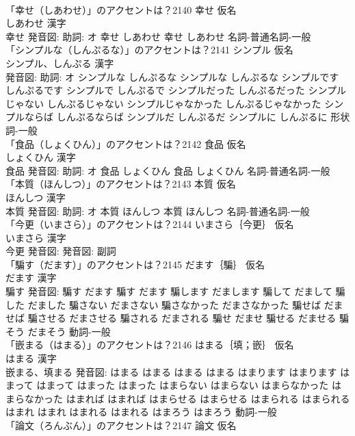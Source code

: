 \documentclass[8pt]{extreport}
\begin{document}
\begin{CJK}{UTF8}{min}
\\	「幸せ（しあわせ）」のアクセントは？2140	幸せ 仮名　
\\	しあわせ 漢字　
\\	幸せ 発音図: 助詞: オ	幸せ しあわせ		幸せ しあわせ				名詞-普通名詞-一般 
\\	「シンプルな（しんぷるな）」のアクセントは？2141	シンプル 仮名　
\\	シンプル、しんぷる 漢字　
\\	発音図: 助詞: オ	シンプルな しんぷるな		シンプルな しんぷるな シンプルです しんぷるです シンプルで しんぷるで シンプルだった しんぷるだった シンプルじゃない しんぷるじゃない シンプルじゃなかった しんぷるじゃなかった シンプルならば しんぷるならば シンプルだ しんぷるだ シンプルに しんぷるに				形状詞-一般 
\\	「食品（しょくひん）」のアクセントは？2142	食品 仮名　
\\	しょくひん 漢字　
\\	食品 発音図: 助詞: オ	食品 しょくひん		食品 しょくひん				名詞-普通名詞-一般 
\\	「本質（ほんしつ）」のアクセントは？2143	本質 仮名　
\\	ほんしつ 漢字　
\\	本質 発音図: 助詞: オ	本質 ほんしつ		本質 ほんしつ				名詞-普通名詞-一般 
\\	「今更（いまさら）」のアクセントは？2144	いまさら｛今更｝ 仮名　
\\	いまさら 漢字　
\\	今更 発音図: 発音図:							副詞 
\\	「騙す（だます）」のアクセントは？2145	だます｛騙｝ 仮名　
\\	だます 漢字　
\\	騙す 発音図:	騙す だます		騙す だます 騙します だまします 騙して だまして 騙した だました 騙さない だまさない 騙さなかった だまさなかった 騙せば だませば 騙させる だまさせる 騙される だまされる 騙せ だませ 騙せる だませる 騙そう だまそう				動詞-一般 
\\	「嵌まる（はまる）」のアクセントは？2146	はまる｛填；嵌｝ 仮名　
\\	はまる 漢字　
\\	嵌まる、填まる 発音図:	はまる はまる		はまる はまる はまります はまります はまって はまって はまった はまった はまらない はまらない はまらなかった はまらなかった はまれば はまれば はまらせる はまらせる はまられる はまられる はまれ はまれ はまれる はまれる はまろう はまろう				動詞-一般 
\\	「論文（ろんぶん）」のアクセントは？2147	論文 仮名　

\end{CJK}
\end{document}
